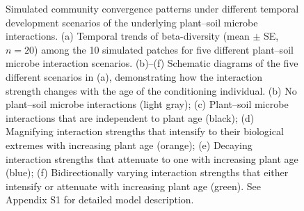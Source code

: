 \newpage
\begin{figure}[h]
	\centering
	\caption[Simulated community convergence patterns under different temporal development scenarios of the underlying plant--soil microbe interactions.]
		{\hspace{1mm} 
		Simulated community convergence patterns under different temporal development scenarios of the underlying plant--soil microbe interactions.
		(a) Temporal trends of beta-diversity (mean $\pm$ SE, $n = 20$) among the 10 simulated patches for five different plant--soil microbe interaction scenarios. (b)--(f) Schematic diagrams of the five different scenarios in (a), demonstrating how the interaction strength changes with the age of the conditioning individual.
		(b) No plant--soil microbe interactions (light gray); (c) Plant--soil microbe interactions that are independent to plant age (black); (d) Magnifying interaction strengths that intensify to their biological extremes with increasing plant age (orange); (e) Decaying interaction strengths that attenuate to one with increasing plant age (blue); (f) Bidirectionally varying interaction strengths that either intensify or attenuate with increasing plant age (green). See Appendix S1 for detailed model description.}
	\label{fig:SimulationComplexPSF}
\end{figure}


